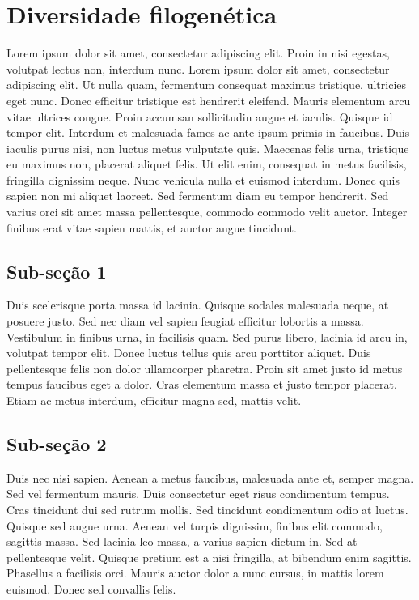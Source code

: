 \documentclass[]{book}
\begin{document}
\hypertarget{diversidade-filogenuxe9tica}{%
\chapter{Diversidade filogenética}\label{diversidade-filogenuxe9tica}}

Lorem ipsum dolor sit amet, consectetur adipiscing elit. Proin in nisi egestas, volutpat lectus non, interdum nunc. Lorem ipsum dolor sit amet, consectetur adipiscing elit. Ut nulla quam, fermentum consequat maximus tristique, ultricies eget nunc. Donec efficitur tristique est hendrerit eleifend. Mauris elementum arcu vitae ultrices congue. Proin accumsan sollicitudin augue et iaculis. Quisque id tempor elit. Interdum et malesuada fames ac ante ipsum primis in faucibus. Duis iaculis purus nisi, non luctus metus vulputate quis. Maecenas felis urna, tristique eu maximus non, placerat aliquet felis. Ut elit enim, consequat in metus facilisis, fringilla dignissim neque. Nunc vehicula nulla et euismod interdum. Donec quis sapien non mi aliquet laoreet. Sed fermentum diam eu tempor hendrerit. Sed varius orci sit amet massa pellentesque, commodo commodo velit auctor. Integer finibus erat vitae sapien mattis, et auctor augue tincidunt.

\hypertarget{sub-seuxe7uxe3o-1-4}{%
\section{Sub-seção 1}\label{sub-seuxe7uxe3o-1-4}}

Duis scelerisque porta massa id lacinia. Quisque sodales malesuada neque, at posuere justo. Sed nec diam vel sapien feugiat efficitur lobortis a massa. Vestibulum in finibus urna, in facilisis quam. Sed purus libero, lacinia id arcu in, volutpat tempor elit. Donec luctus tellus quis arcu porttitor aliquet. Duis pellentesque felis non dolor ullamcorper pharetra. Proin sit amet justo id metus tempus faucibus eget a dolor. Cras elementum massa et justo tempor placerat. Etiam ac metus interdum, efficitur magna sed, mattis velit.

\hypertarget{sub-seuxe7uxe3o-2-4}{%
\section{Sub-seção 2}\label{sub-seuxe7uxe3o-2-4}}

Duis nec nisi sapien. Aenean a metus faucibus, malesuada ante et, semper magna. Sed vel fermentum mauris. Duis consectetur eget risus condimentum tempus. Cras tincidunt dui sed rutrum mollis. Sed tincidunt condimentum odio at luctus. Quisque sed augue urna. Aenean vel turpis dignissim, finibus elit commodo, sagittis massa. Sed lacinia leo massa, a varius sapien dictum in. Sed at pellentesque velit. Quisque pretium est a nisi fringilla, at bibendum enim sagittis. Phasellus a facilisis orci. Mauris auctor dolor a nunc cursus, in mattis lorem euismod. Donec sed convallis felis.
\end{document}
